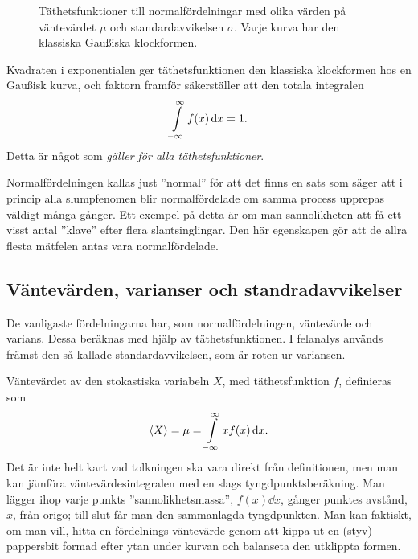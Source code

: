 \documentclass[11pt,a4paper, swedish
]{article}
\newcounter{exempel_counter}%
\begin{document}
\begin{figure}
\centering

\caption{Täthetsfunktioner till normalfördelningar med olika värden på
väntevärdet $\mu$ och standardavvikelsen $\sigma$. Varje kurva har den
klassiska Gau\ss{}iska klockformen.}\label{fig:normal_dist}
\end{figure}

Kvadraten i exponentialen ger täthetsfunktionen den
klassiska klockformen hos en Gau\ss{}isk kurva, och faktorn framför
säkerställer att den totala integralen
\begin{equation}
\int_{-\infty}^{\infty} f(x)\id{x} = 1.
\end{equation}
Detta är något som \emph{gäller för alla täthetsfunktioner}. 

Normalfördelningen kallas just ''normal'' för att det finns en sats
som säger att i princip alla slumpfenomen blir normalfördelade om
samma process upprepas väldigt många gånger. Ett exempel på detta är
om man sannolikheten att få ett visst antal ''klave'' efter flera
slantsinglingar. Den här egenskapen gör att de allra flesta 
mätfelen antas vara normalfördelade.



\subsection{Väntevärden, varianser och standradavvikelser}
De vanligaste fördelningarna har, som normalfördelningen, väntevärde
och varians. Dessa beräknas med hjälp av täthetsfunktionen. I
felanalys används främst den så kallade standardavvikelsen, som 
är roten ur variansen.

Väntevärdet av den stokastiska variabeln $X$, med täthetsfunktion $f$,
definieras som 
\begin{equation}\label{eq:ev}
\ev{X} = \mu = \int_{-\infty}^\infty x f(x)\id{x}.
\end{equation}
Det är inte helt kart vad tolkningen ska vara direkt från
definitionen, men man kan jämföra väntevärdesintegralen med en slags
tyngdpunktsberäkning. Man lägger ihop varje punkts
''sannolikhetsmassa'', $f(x)\dd{x}$, gånger punktes avstånd, $x$, från
origo; till slut får man den sammanlagda tyngdpunkten. Man kan
faktiskt, om man vill, hitta en fördelnings väntevärde genom att kippa
ut en (styv) pappersbit formad efter ytan under kurvan och balanseta
den utklippta formen. 
\end{document}
